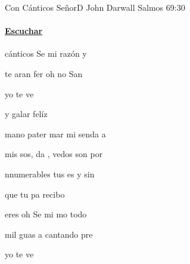 \documentclass[12pt, spanish]{book}
\newcommand{\NotCCLIed}{\relax}
\begin{document}
    \begin{song}{Con Cánticos Señor}{D}
    {} %
    {John Darwall}
    {Salmos 69:30} %
    {} %
        \ifChordBk
        \paragraph{\mbox{}\hfill\protect\href{https://open.spotify.com/intl-es/track/6N6loBqpYEfTL7OKZ3wWQB}{Escuchar}\mbox{}\hfill}
        \fi

        \begin{SBVerse}
             cánticos Se mi razón y 

            te aran  fer oh no San 
        \end{SBVerse}

        \begin{SBChorus}
               yo te ve

            y galar felíz 
        \end{SBChorus}

        \begin{SBVerse}
             mano pater mar mi senda a

            mis sos, da , vedos son por 
        \end{SBVerse}

        \begin{SBVerse}
            nnumerables  tus es y sin 

            que  tu pa recibo  
        \end{SBVerse}

        \begin{SBVerse}
             eres oh Se mi mo todo 

            mil guas  a cantando pre 
        \end{SBVerse}

        \begin{SBChorus}
               yo te ve


\end{SBChorus}
\end{song}
\end{document}
